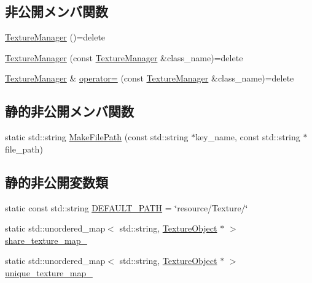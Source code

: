 \subsection*{非公開メンバ関数}
\begin{DoxyCompactItemize}
\item 
\mbox{\hyperlink{class_texture_manager_a379a79168e8481b70c188259e0672981}{Texture\+Manager}} ()=delete
\item 
\mbox{\hyperlink{class_texture_manager_a4ef42214937c5c9e58f87c28a079a858}{Texture\+Manager}} (const \mbox{\hyperlink{class_texture_manager}{Texture\+Manager}} \&class\+\_\+name)=delete
\item 
\mbox{\hyperlink{class_texture_manager}{Texture\+Manager}} \& \mbox{\hyperlink{class_texture_manager_a3f13712c65812a9053852165a9a67824}{operator=}} (const \mbox{\hyperlink{class_texture_manager}{Texture\+Manager}} \&class\+\_\+name)=delete
\end{DoxyCompactItemize}
\subsection*{静的非公開メンバ関数}
\begin{DoxyCompactItemize}
\item 
static std\+::string \mbox{\hyperlink{class_texture_manager_a950562ff671a620592708906925fad7f}{Make\+File\+Path}} (const std\+::string $\ast$key\+\_\+name, const std\+::string $\ast$file\+\_\+path)
\end{DoxyCompactItemize}
\subsection*{静的非公開変数類}
\begin{DoxyCompactItemize}
\item 
static const std\+::string \mbox{\hyperlink{class_texture_manager_a7cdcbb47cf36d179ae88716210e7db65}{D\+E\+F\+A\+U\+L\+T\+\_\+\+P\+A\+TH}} = \char`\"{}resource/Texture/\char`\"{}
\item 
static std\+::unordered\+\_\+map$<$ std\+::string, \mbox{\hyperlink{class_texture_object}{Texture\+Object}} $\ast$ $>$ \mbox{\hyperlink{class_texture_manager_a8488bb78ab5b797291a5a82e33da3486}{share\+\_\+texture\+\_\+map\+\_\+}}
\item 
static std\+::unordered\+\_\+map$<$ std\+::string, \mbox{\hyperlink{class_texture_object}{Texture\+Object}} $\ast$ $>$ \mbox{\hyperlink{class_texture_manager_af9d3a68306acf224380084508ee2fbdd}{unique\+\_\+texture\+\_\+map\+\_\+}}
\end{DoxyCompactItemize}


